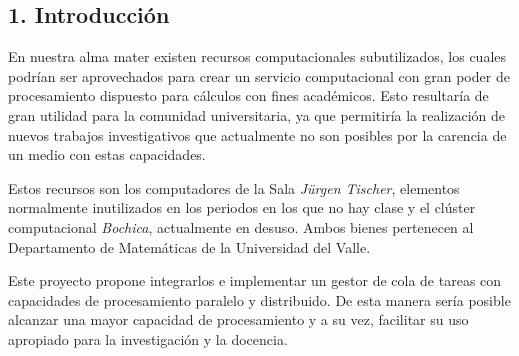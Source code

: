 \begin{doublespace}
\begin{tightcenter}
\section{1. Introducción}
\mylinespacing
\end{tightcenter}

\begin{multicols*}{2}

    En nuestra alma mater existen recursos computacionales subutilizados, los cuales podrían ser aprovechados para crear un servicio computacional con gran poder de procesamiento dispuesto para cálculos con fines académicos. Esto resultaría de gran utilidad para la comunidad universitaria, ya que permitiría la realización de nuevos trabajos investigativos que actualmente no son posibles por la carencia de un medio con estas capacidades.

    \vspace{3mm} 

    Estos recursos son los computadores de la Sala \textit{Jürgen Tischer}, elementos normalmente inutilizados en los periodos en los que no hay clase y el clúster computacional \textit{Bochica}, actualmente en desuso. Ambos bienes pertenecen al Departamento de Matemáticas de la Universidad del Valle.

    \vspace{3mm} 

    Este proyecto propone integrarlos e implementar un gestor de cola de tareas con capacidades de procesamiento paralelo y distribuido. De esta manera sería posible alcanzar una mayor capacidad de procesamiento y a su vez, facilitar su uso apropiado para la investigación y la docencia. 

    \blindtext\blindtext
    
\end{multicols*}

\mylinespacing
\mylinespacing
\begin{tightcenter}
\end{tightcenter}
\end{doublespace}
